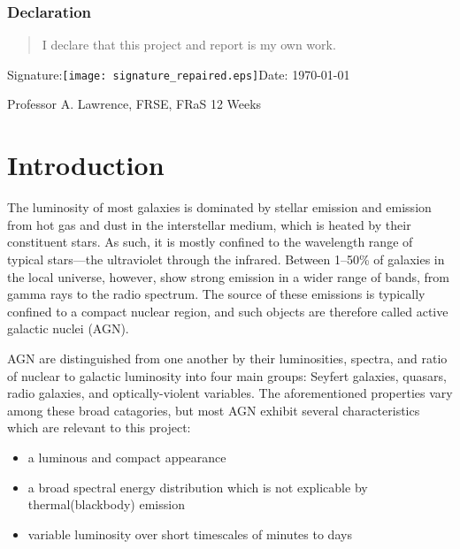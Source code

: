 \documentclass[a4paper,11pt]{article}
\begin{document}
\vspace*{1cm}

\subsubsection*{Declaration}
\begin{quotation}
    I declare that this project and report is my own work.
\end{quotation}

\hspace*{1cm}Signature:\hspace*{1cm}\texttt{[image: signature\_repaired.eps]}\hspace*{1cm}Date: \today

\vfill
{} Professor A. Lawrence, FRSE, FRaS
\hfill
12 Weeks

\newpage
\setcounter{page}{1} %
\tableofcontents

\newpage
\section{Introduction}\label{sec:introduction}

The luminosity of most galaxies is dominated by stellar emission and emission
from hot gas and dust in the interstellar medium, which is heated by their constituent stars. As such, it is mostly confined to the wavelength range of typical stars---the ultraviolet through the infrared. Between 1--50\% of galaxies in the local universe, however, show strong emission in a wider range of bands, from gamma rays to the radio spectrum. The source of these emissions is typically confined to a compact nuclear region, and such objects are therefore called active galactic nuclei (AGN).\cite{mcclure_2019}

AGN are distinguished from one another by their luminosities, spectra, and
ratio of nuclear to galactic luminosity into four main groups: Seyfert galaxies,
quasars, radio galaxies, and optically-violent variables. The aforementioned
properties vary among these broad catagories, but most AGN exhibit several characteristics which are relevant to this project\cite{mcclure_2019}:

\begin{itemize}
    \item a luminous and compact appearance
    \item a broad spectral energy distribution which is not explicable by thermal(blackbody) emission
    \item variable luminosity over short timescales of minutes to days
\end{itemize}
\end{document}
